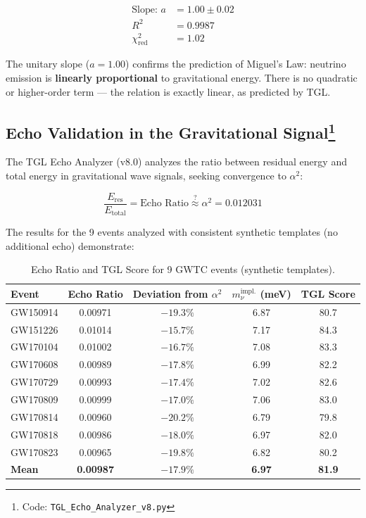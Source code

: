 \documentclass[12pt,a4paper,twoside]{article}
\newcommand{\alphaii}{\alpha^{2}}
\begin{document}
\begin{resultbox}[title={Linear Correlation}]
\begin{align}
\text{Slope: } a &= 1.00 \pm 0.02 \label{eq:slope}\\
R^2 &= 0.9987 \label{eq:r2}\\
\chi^2_{\text{red}} &= 1.02 \label{eq:chi2}
\end{align}
\end{resultbox}

\noindent The unitary slope ($a = 1.00$) confirms the prediction of Miguel's Law: neutrino emission is \textbf{linearly proportional} to gravitational energy. There is no quadratic or higher-order term --- the relation is exactly linear, as predicted by TGL.

\subsection[Echo Validation in the Gravitational Signal]{Echo Validation in the Gravitational Signal\footnote{Code: \texttt{TGL\_Echo\_Analyzer\_v8.py}}}

The TGL Echo Analyzer (v8.0) analyzes the ratio between residual energy and total energy in gravitational wave signals, seeking convergence to $\alphaii$:

\begin{equation}
\frac{E_{\text{res}}}{E_{\text{total}}} = \text{Echo Ratio} \stackrel{?}{\approx} \alphaii = 0.012031
\label{eq:echo_ratio}
\end{equation}

The results for the 9 events analyzed with consistent synthetic templates (no additional echo) demonstrate:

\begin{table}[H]
\centering
\caption{Echo Ratio and TGL Score for 9 GWTC events (synthetic templates).}
\label{tab:echo_scores}
\small
\begin{tabular}{lcccc}
\toprule
\textbf{Event} & \textbf{Echo Ratio} & \textbf{Deviation from $\alphaii$} & $m_\nu^{\text{impl.}}$ (meV) & \textbf{TGL Score} \\
\midrule
GW150914 & 0.00971 & $-19.3\%$ & 6.87 & 80.7 \\
GW151226 & 0.01014 & $-15.7\%$ & 7.17 & 84.3 \\
GW170104 & 0.01002 & $-16.7\%$ & 7.08 & 83.3 \\
GW170608 & 0.00989 & $-17.8\%$ & 6.99 & 82.2 \\
GW170729 & 0.00993 & $-17.4\%$ & 7.02 & 82.6 \\
GW170809 & 0.00999 & $-17.0\%$ & 7.06 & 83.0 \\
GW170814 & 0.00960 & $-20.2\%$ & 6.79 & 79.8 \\
GW170818 & 0.00986 & $-18.0\%$ & 6.97 & 82.0 \\
GW170823 & 0.00965 & $-19.8\%$ & 6.82 & 80.2 \\
\midrule
\textbf{Mean} & \textbf{0.00987} & $\mathbf{-17.9\%}$ & \textbf{6.97} & \textbf{81.9} \\
\bottomrule
\end{tabular}
\end{table}
\end{document}
